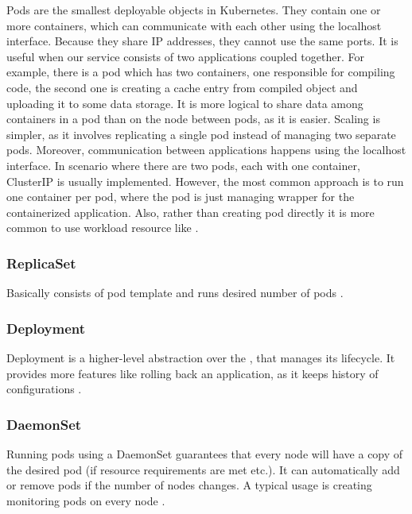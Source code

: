 Pods are the smallest deployable objects in Kubernetes. They contain one or more containers, which can communicate with each other using the localhost interface. Because they share IP addresses, they cannot use the same ports. It is useful when our service consists of two applications coupled together. For example, there is a pod which has two containers, one responsible for compiling code, the second one is creating a cache entry from compiled object and uploading it to some data storage. It is more logical to share data among containers in a pod than on the node between pods, as it is easier. Scaling is simpler, as it involves replicating a single pod instead of managing two separate pods. Moreover, communication between applications happens using the localhost interface. In scenario where there are two pods, each with one container, ClusterIP \textit{} is usually implemented. However, the most common approach is to run one container per pod, where the pod is just managing wrapper for the containerized application. Also, rather than creating pod directly it is more common to use workload resource like \textit{} \cite{KubernetesDocs}. 


\subsubsection{ReplicaSet}
\label{replicaset}

Basically \textit{} consists of pod template and runs desired number of pods \cite{KubernetesDocs}. 


\subsubsection{Deployment}
\label{deployment}

Deployment is a higher-level abstraction over the \textit{}, that manages its lifecycle. It provides more features like rolling back an application, as it keeps history of configurations \cite{KubernetesDocs}.

\subsubsection{DaemonSet}
\label{daemonset}

Running pods using a DaemonSet guarantees that every node will have a copy of the desired pod (if resource requirements are met etc.). It can automatically add or remove pods if the number of nodes changes. A typical usage is creating monitoring pods on every node \cite{KubernetesDocs}. 



